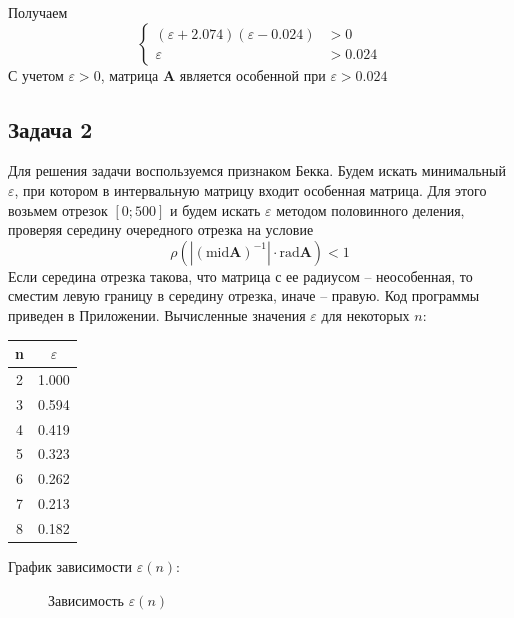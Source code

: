 \documentclass[14pt,a4paper,article]{ncc}
\begin{document}
Получаем
\begin{equation}
 \begin{cases}
   (\varepsilon + 2.074)(\varepsilon - 0.024) &> 0 \\
   \varepsilon &> 0.024
 \end{cases}
\end{equation}
С учетом $\varepsilon > 0$, матрица \textbf{A} является особенной
при $\varepsilon > 0.024$

\subsection{Задача 2}
Для решения задачи воспользуемся признаком Бекка. Будем искать минимальный $\varepsilon$, при котором 
в интервальную матрицу входит особенная матрица. Для этого возьмем отрезок $[0; 500]$ и будем
искать $\varepsilon$ методом половинного деления, проверяя середину очередного отрезка на условие
$$ \rho(|(\text{mid} \textbf{A})^{-1}| \cdot \text{rad} \textbf{A}) < 1 $$
Если середина отрезка такова, что матрица с ее радиусом -- неособенная, то сместим левую границу в середину отрезка,
иначе -- правую. Код программы приведен в Приложении.
Вычисленные значения $\varepsilon$ для некоторых $n$:

\begin{center}
\begin{tabular}{|c|c|}
\hline
n & $\varepsilon$ \\
\hline
2 & 1.000\\
3 & 0.594\\
4 & 0.419\\
5 & 0.323\\
6 & 0.262\\
7 & 0.213\\
8 & 0.182\\
\hline
\end{tabular}
\end{center}

График зависимости $\varepsilon(n)$:
\begin{figure}[h]
\caption{Зависимость $\varepsilon(n)$}
\label{fig:image}
\end{figure}
\end{document}
